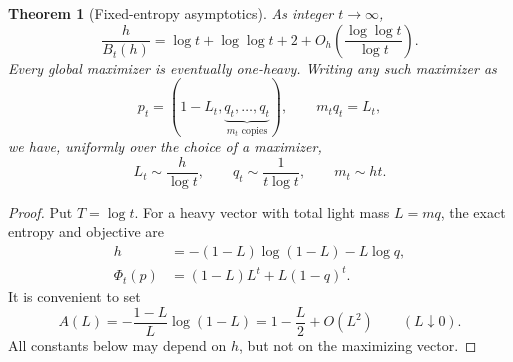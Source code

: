 \documentclass[11pt]{article}
\numberwithin{equation}{section}
\newtheorem{theorem}{Theorem}[section]
\begin{document}
\begin{theorem}[Fixed-entropy asymptotics]\label{thm:asymptotics}
As integer $t\to\infty$,
\begin{equation}\label{eq:sharp-asymptotic}
 \frac{h}{B_t(h)}
 =\log t+\log\log t+2
  +O_h\!\left(\frac{\log\log t}{\log t}\right).
\end{equation}
Every global maximizer is eventually one-heavy. Writing any such maximizer
as
\[
 p_t=\left(1-L_t,
       \underbrace{q_t,\ldots,q_t}_{m_t\text{ copies}}\right),
 \qquad m_tq_t=L_t,
\]
we have, uniformly over the choice of a maximizer,
\begin{equation}\label{eq:optimizer-scales}
 L_t\sim\frac h{\log t},\qquad
 q_t\sim\frac1{t\log t},\qquad
 m_t\sim ht.
\end{equation}
\end{theorem}
\begin{proof}
Put $T=\log t$. For a heavy vector with total light mass $L=mq$, the exact
entropy and objective are
\begin{equation}\label{eq:L-entropy-objective}
 \begin{aligned}
 h&=-(1-L)\log(1-L)-L\log q,\\
 \Phi_t(p)&=(1-L)L^t+L(1-q)^t.
 \end{aligned}
\end{equation}
It is convenient to set
\begin{equation}\label{eq:A-L}
 A(L)=-\frac{1-L}{L}\log(1-L)
     =1-\frac L2+O(L^2)\qquad(L\downarrow0).
\end{equation}
All constants below may depend on $h$, but not on the maximizing vector.


\end{proof}
\end{document}
